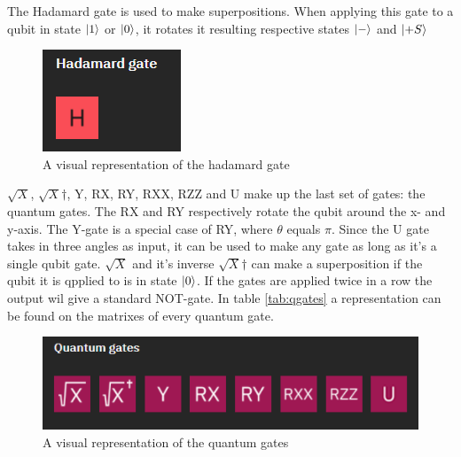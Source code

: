 The Hadamard gate is used to make superpositions. When applying this gate to a qubit in state $\ket{1}$ or $\ket{0}$, it rotates it resulting respective states $\ket{-}$ and $\ket{+S}$

\begin{figure} [h]
    \centering
    \includegraphics[width=\textwidth]{img/hadamard-gate.PNG}
        \caption{A visual representation of the hadamard gate}
        \label{fig:hadamard gates}
\end{figure}

$\sqrt{X}$, $\sqrt{X}$$\dagger$, Y, RX, RY, RXX, RZZ and U make up the last set of gates: the quantum gates. 
The RX and RY respectively rotate the qubit around the x- and y-axis. The Y-gate is a special case of RY, where $\theta$ equals $\pi$.
Since the U gate takes in three angles as input, it can be used to make any gate as long as it's a single qubit gate.
$\sqrt{X}$ and it's inverse $\sqrt{X}$$\dagger$ can make a superposition if the qubit it is qpplied to is in state $\ket{0}$. If the gates are applied twice in a row the output wil give a standard NOT-gate.
In table \ref{tab:qgates} a representation can be found on the matrixes of every quantum gate.

\begin{figure} [h]
    \centering
    \includegraphics[width=\textwidth]{img/quantum-gates.PNG}
        \caption{A visual representation of the quantum gates}
        \label{fig:quantum gates}
\end{figure}

